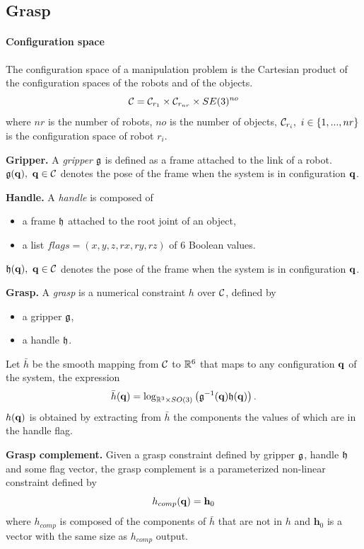 \subsection{Grasp}\label{subsec:grasp}

\paragraph{Configuration space} The configuration space of a manipulation problem is the Cartesian product of the configuration spaces of the robots and of the objects.
$$
\mathcal{C} = \mathcal{C}_{r_1}\times\mathcal{C}_{r_{nr}}\times SE(3)^{no}
$$
where $nr$ is the number of robots, $no$ is the number of objects, $\CS_{r_i},\ i\in\{1,...,nr\}$ is the configuration space of robot $r_i$.
\begin{definition}\textbf{Gripper.}\label{def:gripper}
  A \emph{gripper} $\mathfrak{g}$ is defined as a frame attached to the link of a robot. $\gripper(\conf),\ \conf\in\CS$ denotes the pose of the frame when the system is in configuration $\mathbf{q}$.
\end{definition}
\begin{definition}\textbf{Handle.}\label{def:handle}
  A \emph{handle} is composed of
  \begin{itemize}
  \item a frame $\mathfrak{h}$ attached to the root joint of an object,
  \item a list $flags=(x,y,z,rx,ry,rz)$ of 6 Boolean values.
  \end{itemize}
  $\mathfrak{h}(\mathbf{q}),\ \mathbf{q}\in\mathcal{C}$ denotes the pose of the frame when the system is in configuration $\mathbf{q}$.
\end{definition}
\begin{definition}\textbf{Grasp.}\label{def:grasp}
  A \emph{grasp} is a numerical constraint $h$ over $\mathcal{C}$, defined by
  \begin{itemize}
  \item a gripper $\mathfrak{g}$,
  \item a handle $\mathfrak{h}$.
  \end{itemize}
  Let $\bar{h}$ be the smooth mapping from $\mathcal{C}$ to $\mathbb{R}^6$ that maps to any configuration $\mathbf{q}$ of the system, the expression
  \begin{equation}\label{eq:barh}
    \bar{h}(\conf) = \log_{\reals^3\times SO(3)}\left(\gripper^{-1}(\conf) \handle(\conf)\right).
  \end{equation}
  $h(\mathbf{q})$ is obtained by extracting from $\bar{h}$ the components the values of which are \true in the handle flag.
\end{definition}
\begin{definition}\textbf{Grasp complement.}
  Given a grasp constraint defined by gripper $\mathfrak{g}$, handle $\mathfrak{h}$ and some flag vector, the grasp complement is a parameterized non-linear constraint defined by
  $$
  h_{comp}(\mathbf{q}) = \mathbf{h}_0
  $$
  where $h_{comp}$ is composed of the components of $\bar{h}$ that are not in $h$ and $\mathbf{h}_0$ is a vector with the same size as $h_{comp}$ output.
\end{definition}


